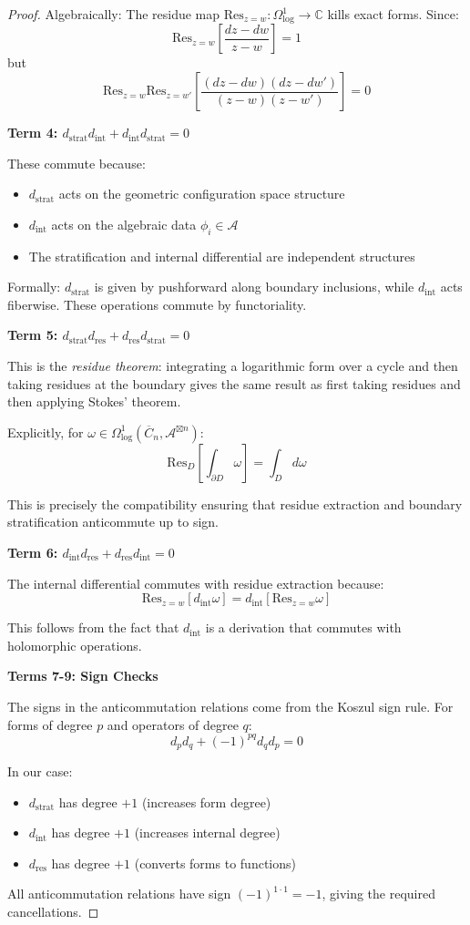 \begin{proof}
Algebraically: The residue map $\text{Res}_{z=w}: \Omega^1_{\text{log}} \to \mathbb{C}$ 
kills exact forms. Since:
$$\text{Res}_{z=w}\left[\frac{dz-dw}{z-w}\right] = 1$$
but
$$\text{Res}_{z=w}\text{Res}_{z=w'}\left[\frac{(dz-dw)(dz-dw')}{(z-w)(z-w')}\right] = 0$$

\textbf{Term 4: $d_{\text{strat}} d_{\text{int}} + d_{\text{int}} d_{\text{strat}} = 0$}

These commute because:
\begin{itemize}
\item $d_{\text{strat}}$ acts on the geometric configuration space structure
\item $d_{\text{int}}$ acts on the algebraic data $\phi_i \in \mathcal{A}$
\item The stratification and internal differential are independent structures
\end{itemize}

Formally: $d_{\text{strat}}$ is given by pushforward along boundary inclusions, 
while $d_{\text{int}}$ acts fiberwise. These operations commute by functoriality.

\textbf{Term 5: $d_{\text{strat}} d_{\text{res}} + d_{\text{res}} d_{\text{strat}} = 0$}

This is the \emph{residue theorem}: integrating a logarithmic form over a cycle 
and then taking residues at the boundary gives the same result as first taking 
residues and then applying Stokes' theorem.

Explicitly, for $\omega \in \Omega^1_{\text{log}}(\overline{C}_n, \mathcal{A}^{\boxtimes n})$:
$$\text{Res}_{D}\left[\int_{\partial D} \omega\right] = \int_D d\omega$$

This is precisely the compatibility ensuring that residue extraction and boundary 
stratification anticommute up to sign.

\textbf{Term 6: $d_{\text{int}} d_{\text{res}} + d_{\text{res}} d_{\text{int}} = 0$}

The internal differential commutes with residue extraction because:
$$\text{Res}_{z=w}[d_{\text{int}} \omega] = d_{\text{int}}[\text{Res}_{z=w} \omega]$$

This follows from the fact that $d_{\text{int}}$ is a derivation that commutes 
with holomorphic operations.

\textbf{Terms 7-9: Sign Checks}

The signs in the anticommutation relations come from the Koszul sign rule. For 
forms of degree $p$ and operators of degree $q$:
$$d_p d_q + (-1)^{pq} d_q d_p = 0$$

In our case:
\begin{itemize}
\item $d_{\text{strat}}$ has degree $+1$ (increases form degree)
\item $d_{\text{int}}$ has degree $+1$ (increases internal degree)
\item $d_{\text{res}}$ has degree $+1$ (converts forms to functions)
\end{itemize}

All anticommutation relations have sign $(-1)^{1 \cdot 1} = -1$, giving the 
required cancellations.
\end{proof}

